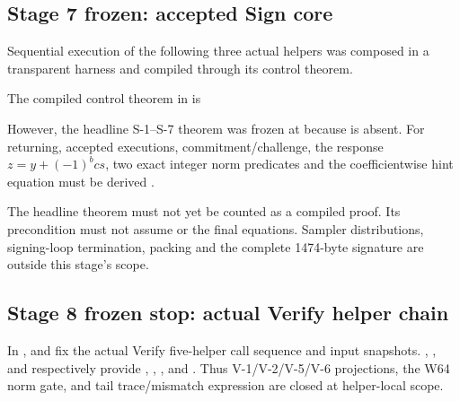 \subsection{Stage 7 frozen: accepted Sign core}

Sequential execution of the following three actual helpers was composed in a
transparent harness and compiled through its control theorem.
\begin{center}
\quad
{}\quad
{}
\end{center}
The compiled control theorem in  is
\begin{center}
\end{center}
However, the headline S-1--S-7 theorem was frozen at
 because
 is absent.
For returning, accepted executions, commitment/challenge, the response
\(z=y+(-1)^bcs\), two exact integer norm predicates and the coefficientwise hint
equation must be derived \cite{week16-mincore-plan,claim-ledger}.

The headline theorem must not yet be counted as a compiled proof. Its
precondition must not assume  or the final equations.
Sampler distributions, signing-loop termination, packing and the complete
1474-byte signature are outside this stage's scope.

\subsection{Stage 8 frozen stop: actual Verify helper chain}

In ,
 and
 fix the actual
Verify five-helper call sequence and input snapshots.
,
, and
 respectively provide
,
,
, and
\cite{week16-verify-report}. Thus V-1/V-2/V-5/V-6 projections, the W64 norm gate,
and tail trace/mismatch expression are closed at helper-local scope.

